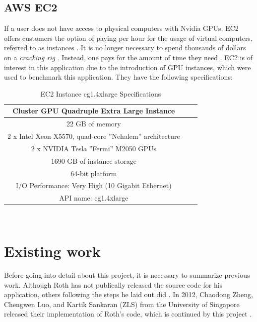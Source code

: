 \documentclass[12pt]{article}
\begin{document}
\subsection{AWS EC2}
\indent If a user does not have access to physical computers with Nvidia GPUs, EC2 offers customers the option of paying per hour for the usage of virtual computers, referred to as instances \cite{ec2}. It is no longer necessary to spend thousands of dollars on a \textit{cracking rig} \cite{gosney}. Instead, one pays for the amount of time they need \cite{ec2}. EC2 is of interest in this application due to the introduction of GPU instances, which were used to benchmark this application. They have the following specifications:\\
\begin{table}[htbp]
\begin{center}
\begin{tabular}{ |c|c|c| } %
 \hline
 \textbf{Cluster GPU Quadruple Extra Large Instance} \\ %
 \hline
 22 GB of memory\\ %
 \hline
2 x Intel Xeon X5570, quad-core ”Nehalem” architecture\\%
 \hline
2 x NVIDIA Tesla ”Fermi” M2050 GPUs\\%
 \hline
1690 GB of instance storage\\%
\hline
64-bit platform\\%
\hline
 I/O Performance: Very High (10 Gigabit Ethernet)\\%
\hline
API name: cg1.4xlarge \\%
\hline
 \end{tabular}
\end{center}
\caption{EC2 Instance cg1.4xlarge Specifications}
\end{table}
\\

\section{Existing work}
\indent Before going into detail about this project, it is necessary to summarize previous work. Although Roth has not publically released the source code for his application, others following the steps he laid out did \cite{cck}. In 2012, Chaodong Zheng, Chengwen Luo, and Kartik Sankaran (ZLS) from the University of Singapore released their implementation of Roth's code, which is continued by this project \cite{cck}.
\end{document}
